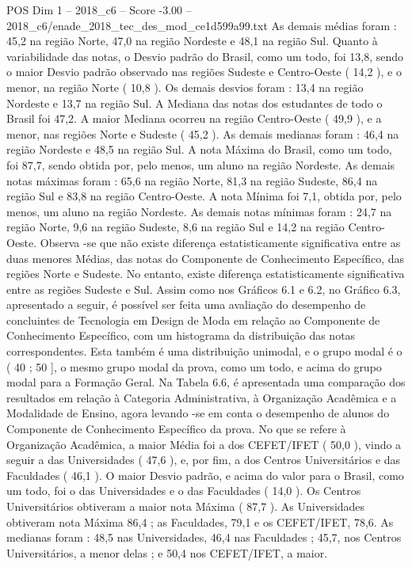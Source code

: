 \begin{textsample}{POS Dim 1 – 2018\_c6 – Score -3.00 – 2018\_c6/enade\_2018\_tec\_des\_mod\_ce1d599a99.txt}
As demais médias foram : 45,2 na região Norte, 47,0 na região Nordeste e 48,1 na região Sul.
Quanto à variabilidade das notas, o Desvio padrão do Brasil, como um todo, foi 13,8, sendo o maior Desvio padrão observado nas regiões Sudeste e Centro-Oeste ( 14,2 ), e o menor, na região Norte ( 10,8 ).
Os demais desvios foram : 13,4 na região Nordeste e 13,7 na região Sul.
A Mediana das notas dos estudantes de todo o Brasil foi 47,2.
A maior Mediana ocorreu na região Centro-Oeste ( 49,9 ), e a menor, nas regiões Norte e Sudeste ( 45,2 ).
As demais medianas foram : 46,4 na região Nordeste e 48,5 na região Sul.
A nota Máxima do Brasil, como um todo, foi 87,7, sendo obtida por, pelo menos, um aluno na região Nordeste.
As demais notas máximas foram : 65,6 na região Norte, 81,3 na região Sudeste, 86,4 na região Sul e 83,8 na região Centro-Oeste.
A nota Mínima foi 7,1, obtida por, pelo menos, um aluno na região Nordeste.
As demais notas mínimas foram : 24,7 na região Norte, 9,6 na região Sudeste, 8,6 na região Sul e 14,2 na região Centro-Oeste.
Observa -se que não existe diferença estatisticamente significativa entre as duas menores Médias, das notas do Componente de Conhecimento Específico, das regiões Norte e Sudeste.
No entanto, existe diferença estatisticamente significativa entre as regiões Sudeste e Sul.
Assim como nos Gráficos 6.1 e 6.2, no Gráfico 6.3, apresentado a seguir, é possível ser feita uma avaliação do desempenho de concluintes de Tecnologia em Design de Moda em relação ao Componente de Conhecimento Específico, com um histograma da distribuição das notas correspondentes.
Esta também é uma distribuição unimodal, e o grupo modal é o ( 40 ; 50 ], o mesmo grupo modal da prova, como um todo, e acima do grupo modal para a Formação Geral.
Na Tabela 6.6, é apresentada uma comparação dos resultados em relação à Categoria Administrativa, à Organização Acadêmica e a Modalidade de Ensino, agora levando -se em conta o desempenho de alunos do Componente de Conhecimento Específico da prova.
No que se refere à Organização Acadêmica, a maior Média foi a dos CEFET/IFET ( 50,0 ), vindo a seguir a das Universidades ( 47,6 ), e, por fim, a dos Centros Universitários e das Faculdades ( 46,1 ).
O maior Desvio padrão, e acima do valor para o Brasil, como um todo, foi o das Universidades e o das Faculdades ( 14,0 ).
Os Centros Universitários obtiveram a maior nota Máxima ( 87,7 ).
As Universidades obtiveram nota Máxima 86,4 ; as Faculdades, 79,1 e os CEFET/IFET, 78,6.
As medianas foram : 48,5 nas Universidades, 46,4 nas Faculdades ; 45,7, nos Centros Universitários, a menor delas ; e 50,4 nos CEFET/IFET, a maior.

\end{textsample}
